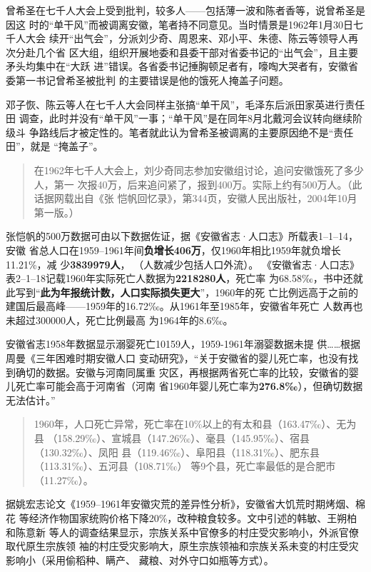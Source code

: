 曾希圣在七千人大会上受到批判，较多人——包括薄一波和陈者香等，说曾希圣是因这
时的“单干风”而被调离安徽，笔者持不同意见。当时情景是1962年1月30日七千人大会
续开“出气会”，分派刘少奇、周恩来、邓小平、朱德、陈云等领导人再次分赴几个省
区大组，组织开展地委和县委干部对省委书记的“出气会”，且主要矛头均集中在“大跃
进”错误。各省委书记捶胸顿足者有，嚎啕大哭者有，安徽省委第一书记曾希圣被批判
的主要错误是他的饿死人掩盖子问题。

邓子恢、陈云等人在七千人大会同样主张搞“单干风”，毛泽东后派田家英进行责任田
调查，此时并没有“单干风”一事；“单干风”是在同年8月北戴河会议转向继续阶级斗
争路线后才被定性的。笔者就此认为曾希圣被调离的主要原因绝不是“责任田”，就是
“掩盖子”。

\begin{quotation}
  在1962年七千人大会上，刘少奇同志参加安徽组讨论，追问安徽饿死了多少人，第一
  次报40万，后来追问紧了，报到400万。实际上约有500万人。（此话据网载出自《张
  恺帆回忆录》，第344页，安徽人民出版社，2004年10月第一版。）
\end{quotation}

张恺帆的500万数据可由以下数据佐证，据《安徽省志·人口志》所载表1--1--14，安徽
省总人口在1959--1961年间\textbf{负增长406万}，仅1960年相比1959年就负增长11.21\%，减
少\textbf{3839979人}，\cite[27]{anhuishengzhi} （人数减少包括人口外流）。
《安徽省志·人口志》表2--1--18记载1960年实际死亡人数据为\textbf{2218280人}，死亡率
为68.58‰，书中还就此写到“\textbf{此为年报统计数，人口实际损失更大}”，1960年的死
亡比例远高于之前的建国后最高峰——1959年的16.72‰。从1961年至1985年，安徽省年死亡
人数再也未超过300000人，死亡比例最高
为1964年的8.6‰。\cite[95-96]{anhuishengzhi}

安徽省志1958年数据显示溺婴死亡10159人，1959-1961年溺婴数据未提
供……\cite[108]{anhuishengzhi}根据周曼《三年困难时期安徽人口
变动研究》，“关于安徽省的婴儿死亡率，也没有找到确切的数据。安徽与河南同属重
灾区，再根据两省死亡率的比较，安徽省的婴儿死亡率可能会高于河南省（河南
省1960年婴儿死亡率为\textbf{276.8‰}），但确切数据无法估计。”

\begin{quotation}
  1960年，人口死亡异常，死亡率在10\%以上的有太和县（163.47‰）、无为县
  （158.29‰）、宣城县（147.26‰）、毫县（145.95‰）、宿县（130.32‰）、凤阳
  县（119.46‰）、阜阳县（118.31‰）、肥东县（113.31‰）、五河县（108.71‰）
  等9个县，死亡率最低的是合肥市（11.27‰）。\cite[98]{anhuishengzhi}
\end{quotation}

据姚宏志论文《1959--1961年安徽灾荒的差异性分析》，安徽省大饥荒时期烤烟、棉花
等经济作物国家统购价格下降20\%，改种粮食较多。文中引述的韩敏、王朔柏和陈意新
等人的调查结果显示，宗族关系中官僚多的村庄受灾影响小，外派官僚取代原生宗族领
袖的村庄受灾影响大，原生宗族领袖和宗族关系未变的村庄受灾影响小（采用偷稻种、瞒产、
藏粮、对外守口如瓶等方式）。

